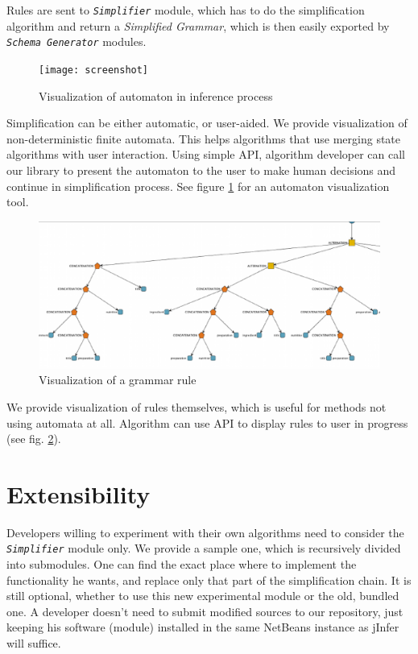 \documentclass[a4paper,8pt,oneside,twocolumn]{article}
\newcommand{\myscale}{0.9}
\newcommand{\jmodule}[1]{\texttt{\textit{#1}}}
\begin{document}
Rules are sent to \jmodule{Simplifier} module, which has to do the simplification algorithm and return a \emph{Simplified Grammar}, which is then easily exported by \jmodule{Schema Generator} modules.

\begin{figure}
	\centering\texttt{[image: screenshot]}
	\caption{Visualization of automaton in inference process} \label{screenshot}
\end{figure}
Simplification can be either automatic, or user-aided.
We provide visualization of non-deterministic finite automata.
This helps algorithms that use merging state algorithms with user interaction.
Using simple API, algorithm developer can call our library to present the automaton to the user to make human decisions and continue in simplification process.
See figure \ref{screenshot} for an automaton visualization tool.

\begin{figure}
	\centering\includegraphics[width=\myscale\columnwidth]{ruledisplayer}
	\caption{Visualization of a grammar rule} \label{ruledisplayer}
\end{figure}
We provide visualization of rules themselves, which is useful for methods not using automata at all.
Algorithm can use API to display rules to user in progress (see fig. \ref{ruledisplayer}).

\section*{Extensibility}
Developers willing to experiment with their own algorithms need to consider the \jmodule{Simplifier} module only.
We provide a sample one, which is recursively divided into submodules.
One can find the exact place where to implement the functionality he wants, and replace only that part of the simplification chain.
It is still optional, whether to use this new experimental module or the old, bundled one.
A developer doesn't need to submit modified sources to our repository, just keeping his software (module) installed in the same NetBeans instance as jInfer will suffice.
\end{document}
